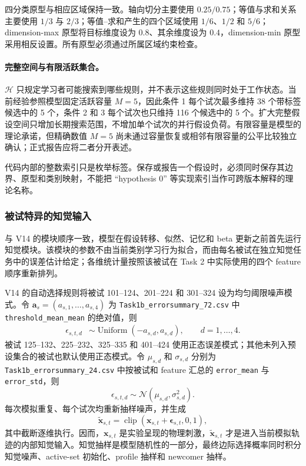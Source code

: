 四分类原型与相应区域保持一致。轴向切分主要使用 $0.25/0.75$；等值与求和关系主要使用 $1/3$ 与 $2/3$；等值--求和产生的四个区域使用 $1/6$、$1/2$ 和 $5/6$；dimension-max 原型将目标维度设为 $0.8$、其余维度设为 $0.4$，dimension-min 原型采用相反设置。所有原型必须通过所属区域约束检查。

\paragraph{完整空间与有限活跃集合。}
$\mathcal H$ 只规定学习者可能搜索到哪些规则，并不表示这些规则同时处于工作状态。当前经验参照模型固定活跃容量 $M=5$，因此条件 1 每个试次最多维持 38 个带标签候选中的 5 个，条件 2 和 3 每个试次也只维持 116 个候选中的 5 个。扩大完整假设空间只增加长期搜索范围，不增加单个试次的并行假设负荷。有限容量是模型的理论承诺，但精确数值 $M=5$ 尚未通过容量恢复或相邻有限容量的公平比较独立确认；正式报告应将二者分开表述。

代码内部的整数索引只是枚举标签。保存或报告一个假设时，必须同时保存其边界、原型和类别映射，不能把 ``hypothesis 0'' 等实现索引当作可跨版本解释的理论名称。


\subsubsection{被试特异的知觉输入}

与 V14 的模块顺序一致，模型在假设转移、似然、记忆和 beta 更新之前首先运行知觉模块。该模块的参数不由当前类别学习行为拟合，而由每名被试在独立知觉任务中的误差估计给定；各维统计量按照该被试在 Task 2 中实际使用的四个 feature 顺序重新排列。

V14 的自动选择规则将被试 101--124、201--224 和 301--324 设为均匀阈限噪声模式。令 $\mathbf a_s=(a_{s,1},\ldots,a_{s,4})$ 为 \texttt{Task1b\_errorsummary\_72.csv} 中 \texttt{threshold\_mean\_mean} 的绝对值，则
\begin{align}
    \epsilon_{s,t,d}
    &\sim\operatorname{Uniform}(-a_{s,d},a_{s,d}),
    \qquad d=1,\ldots,4 .
    \label{eq:modelv2-perception-uniform}
\end{align}
被试 125--132、225--232、325--335 和 401--424 使用正态误差模式；其他未列入预设集合的被试也默认使用正态模式。令 $\mu_{s,d}$ 和 $\sigma_{s,d}$ 分别为 \texttt{Task1b\_errorsummary\_24.csv} 中按被试和 feature 汇总的 \texttt{error\_mean} 与 \texttt{error\_std}，则
\begin{equation}
    \epsilon_{s,t,d}
    \sim
    \mathcal N(\mu_{s,d},\sigma_{s,d}^{2}) .
    \label{eq:modelv2-perception-normal}
\end{equation}
每次模拟重复、每个试次均重新抽样噪声，并生成
\begin{equation}
    \widetilde{\mathbf x}_{s,t}
    =
    \operatorname{clip}
    \left(
        \mathbf x_{s,t}+\boldsymbol\epsilon_{s,t},
        0,1
    \right),
    \label{eq:modelv2-perceived-stimulus}
\end{equation}
其中截断逐维执行。因而，$\mathbf x_{s,t}$ 是实验呈现的物理刺激，$\widetilde{\mathbf x}_{s,t}$ 才是进入当前模拟轨迹的内部知觉输入。知觉抽样是模型随机性的一部分，最终边际选择概率同时积分知觉噪声、active-set 初始化、profile 抽样和 newcomer 抽样。


